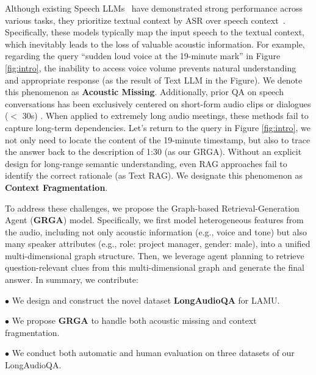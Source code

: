\documentclass[11pt]{article}
\begin{document}
Although existing Speech LLMs~\cite{kimiteam2025kimiaudiotechnicalreport, Qwen3-Omni} have demonstrated strong performance across various tasks, they prioritize textual context by ASR over speech context~\cite{you-etal-2022-end,icassp/LinLCW0MLL24}. Specifically, these models typically map the input speech to the textual context, which inevitably leads to the loss of valuable acoustic information. 
For example, regarding the query ``sudden loud voice at the 19-minute mark'' in Figure \ref{fig:intro}, the inability to access voice volume prevents natural understanding and appropriate response (as the result of Text LLM in the Figure). We denote this phenomenon as \textbf{Acoustic Missing}.
Additionally, prior QA on speech conversations has been exclusively centered on short-form audio clips or dialogues ($<$ 30s) \cite{interspeech/JohnsonPSGGE24,tai/ZhaoJLWW25,longQA}. When applied to extremely long audio meetings, these methods fail to capture long-term dependencies. Let's return to the query in Figure \ref{fig:intro}, we not only need to locate the content of the 19-minute timestamp, but also to trace the answer back to the description of 1:30 (as our GRGA). Without an explicit design for long-range semantic understanding, even RAG approaches \cite{graphmpa,acl/dialogue-rag,icassp/WangSS00YS24} fail to identify the correct rationale (as Text RAG). We designate this phenomenon as \textbf{Context Fragmentation}.

To address these challenges, we propose the Graph-based Retrieval-Generation Agent (\textbf{GRGA}) model. Specifically, we first model heterogeneous features from the audio, including not only acoustic information (e.g., voice and tone) but also many speaker attributes (e.g., role: project manager, gender: male), into a unified multi-dimensional graph structure. Then, we leverage agent planning to retrieve question-relevant clues from this multi-dimensional graph and generate the final answer. In summary, we contribute:

$\bullet$ We design and construct the novel dataset \textbf{LongAudioQA} for LAMU. 

$\bullet$ We propose \textbf{GRGA} to handle both acoustic missing and context fragmentation.

$\bullet$ We conduct both automatic and human evaluation on three datasets of our LongAudioQA.


\end{document}
